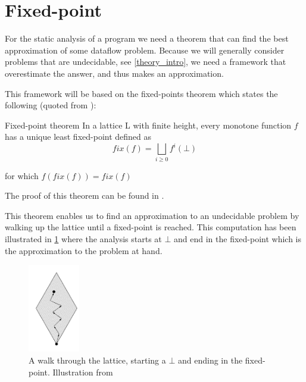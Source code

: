 \section{Fixed-point}
For the static analysis of a program we need a theorem that can find the best approximation of some dataflow problem.
Because we will generally consider problems that are undecidable, see \cref{theory_intro}, we need a framework that overestimate the answer, and thus makes an approximation.

This framework will be based on the fixed-points theorem which states the following (quoted from \citet[p.~13]{schwartzbach}):

\begin{definition}{Fixed-point theorem}\label{fixed_point_definition}
In a lattice L with finite height, every monotone function $f$ has a unique least fixed-point defined as
\[ fix(f) = \bigsqcup_{i \ge 0} f^i(\bot) \]

for which $f(fix(f)) = fix(f)$
\end{definition}

\noindent
The proof of this theorem can be found in \citep[p.~13]{schwartzbach}.

This theorem enables us to find an approximation to an undecidable problem by walking up the lattice until a fixed-point is reached.
This computation has been illustrated in \cref{lattice_walk} where the analysis starts at $\bot$ and end in the fixed-point which is the approximation to the problem at hand.

\begin{figure}
\begin{center}
\includegraphics[width=0.2\textwidth]{figures/fixed-point_walk}
\end{center}
\caption{A walk through the lattice, starting a $\bot$ and ending in the fixed-point. Illustration from \citet[p.~13]{schwartzbach}}
\label{lattice_walk}
\end{figure}
